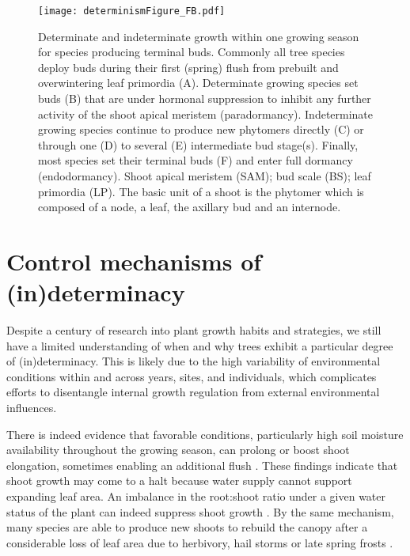 \documentclass{article}
\begin{document}
								\begin{figure}
								\centering
								\texttt{[image: determinismFigure\_FB.pdf]} 
								\caption{Determinate and indeterminate growth within one growing season for species producing terminal buds. Commonly all tree species deploy buds during their first (spring) flush from prebuilt and overwintering leaf primordia (A). Determinate growing species set buds (B) that are under hormonal suppression to inhibit any further activity of the shoot apical meristem (paradormancy). Indeterminate growing species continue to produce new phytomers directly (C) or through one (D) to several (E) intermediate bud stage(s). Finally, most species set their terminal buds (F) and enter full dormancy (endodormancy). Shoot apical meristem (SAM); bud scale (BS); leaf primordia (LP). The basic unit of a shoot is the phytomer which is composed of a node, a leaf, the axillary bud and an internode.}
								\label{fig:fig_2xxx}
								\end{figure}
								
	\section*{Control mechanisms of (in)determinacy}
	Despite a century of research into plant growth habits and strategies, we still have a limited understanding of when and why trees exhibit a particular degree of (in)determinacy. This is likely due to the high variability of environmental conditions within and across years, sites, and individuals, which complicates efforts to disentangle internal growth regulation from external environmental influences.
	
	There is indeed evidence that favorable conditions, particularly high soil moisture availability throughout the growing season, can prolong or boost shoot elongation, sometimes enabling an additional flush \citep{kayaAdaptiveSignificanceIntermittent1994}. 
	These findings indicate that shoot growth may come to a halt because water supply cannot support expanding leaf area. An imbalance in the root:shoot ratio under a given water status of the plant can indeed suppress shoot growth \citep{borchertSimulationRhythmicTree1973}. By the same mechanism, many species are able to produce new shoots to rebuild the canopy after a considerable loss of leaf area due to herbivory, hail storms or late spring frosts \citep{baumgartenNoRiskNo2023a}.  \\
	
\end{document}
